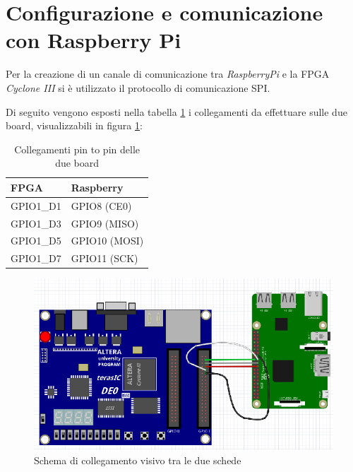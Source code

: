 \documentclass[titlepage]{report}
\begin{document}
	\section*{Configurazione e comunicazione con Raspberry Pi}
	\label{sec:configurazione_raspberrypi}
			
		Per la creazione di un canale di comunicazione tra \textit{RaspberryPi} e la FPGA \textit{Cyclone III} si è utilizzato il protocollo di comunicazione SPI.

		Di seguito vengono esposti nella tabella \ref{tab:wiring} i collegamenti da effettuare sulle due board, visualizzabili in figura \ref{fig:wiring}:

		\begin{table}[ht]
			\centering
			\begin{tabular}{|l|l|}
				\rowcolor{gray!25} %
				\hline
				\textbf{FPGA} & \textbf{Raspberry} \\
				\hline
				GPIO1\_D1 & GPIO8 (CE0) \\
				\hline
				GPIO1\_D3 & GPIO9 (MISO) \\
				\hline
				GPIO1\_D5 & GPIO10 (MOSI) \\
				\hline
				GPIO1\_D7 & GPIO11 (SCK) \\
				\hline
			\end{tabular}
			\caption{Collegamenti pin to pin delle due board}
			\label{tab:wiring}
		\end{table}

		\begin{figure}[ht]
			\centering
			\includegraphics[scale=0.6]{./img/link_fpga_raspi.png}
			\caption{Schema di collegamento visivo tra le due schede}
			\label{fig:wiring}
		\end{figure}
\end{document}
